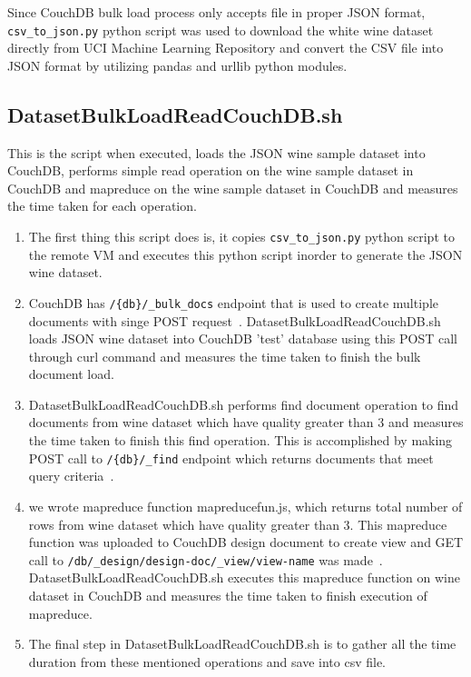 Since CouchDB bulk load process only accepts file in proper JSON
format, \verb|csv_to_json.py| python script was used to
download the white wine dataset directly from UCI Machine Learning
Repository and convert the CSV file into JSON format by utilizing
pandas and urllib python modules.

\subsection{DatasetBulkLoadReadCouchDB.sh}
This is the script when executed, loads the JSON wine sample dataset
into CouchDB, performs simple read operation on the wine sample
dataset in CouchDB and mapreduce on the wine sample
dataset in CouchDB and measures the time taken for each operation.

\begin{enumerate}
  \item The first thing this script does is, it copies \verb|csv_to_json.py|
python script to the remote VM and executes this python script inorder
to generate the JSON wine dataset.
  \item CouchDB has \verb|/{db}/_bulk_docs|
endpoint that is used to create multiple documents with singe POST
request~\cite{www-CouchdbBulkApi}. DatasetBulkLoadReadCouchDB.sh loads JSON wine dataset
into CouchDB  'test' database using this POST call through curl command
and measures the time taken to finish the bulk document load.

  \item DatasetBulkLoadReadCouchDB.sh performs find document operation to find documents
from wine dataset which have quality greater than 3 and measures the time taken to finish this find
operation. This is accomplished by making POST call to
\verb|/{db}/_find| endpoint which returns documents that meet query criteria~\cite{www-CouchdbFind}.

  \item we wrote mapreduce function mapreducefun.js, which returns
    total number of rows from wine dataset which have quality greater than 3. This mapreduce
    function was uploaded to CouchDB design document to create view and GET call to
    \verb|/db/_design/design-doc/_view/view-name| was
    made~\cite{www-CouchdbView}. DatasetBulkLoadReadCouchDB.sh
    executes this mapreduce function on wine dataset in CouchDB and
    measures the time taken to finish execution of mapreduce.
  \item The final step in DatasetBulkLoadReadCouchDB.sh is to gather
    all the time duration from these mentioned operations and save
    into csv file.

\end{enumerate}

